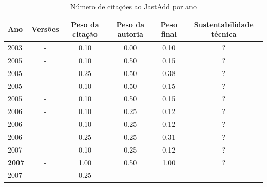 \begin{table}[H]
\caption{Número de citações ao JastAdd por ano}
\centering
\begin{tabular}{| l | c | c | c | c | c |}
  \hline
  Ano & Versões & Peso da citação & Peso da autoria & Peso final & Sustentabilidade técnica \\
  \hline
            2003
          &
          -
          &
          0.10
          &
          0.00
          &
            {\color{red} 0.10}
          &
          ?
          \\
\hline
            2005
          &
          -
          &
          0.10
          &
          0.50
          &
            {\color{red} 0.15}
          &
          ?
          \\
            2005
          &
          -
          &
          0.25
          &
          0.50
          &
            {\color{red} 0.38}
          &
          ?
          \\
            2005
          &
          -
          &
          0.10
          &
          0.50
          &
            {\color{red} 0.15}
          &
          ?
          \\
            2005
          &
          -
          &
          0.10
          &
          0.50
          &
            {\color{red} 0.15}
          &
          ?
          \\
\hline
            2006
          &
          -
          &
          0.10
          &
          0.25
          &
            {\color{red} 0.12}
          &
          ?
          \\
            2006
          &
          -
          &
          0.10
          &
          0.25
          &
            {\color{red} 0.12}
          &
          ?
          \\
            2006
          &
          -
          &
          0.25
          &
          0.25
          &
            {\color{red} 0.31}
          &
          ?
          \\
\hline
            2007
          &
          -
          &
          0.10
          &
          0.25
          &
            {\color{red} 0.12}
          &
          ?
          \\
            {\bf 2007}
          &
          -
          &
          1.00
          &
          0.50
          &
            {\color{blue} 1.00}
          &
          ?
          \\
            2007
          &
          -
          &
          0.25
          &

\end{tabular}
\end{table}
